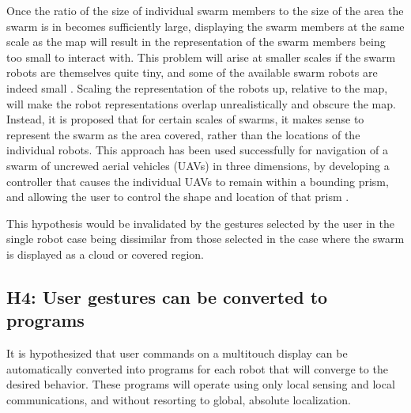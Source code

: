 Once the ratio of the size of individual swarm members to the size of the area the swarm is in becomes sufficiently large, displaying the swarm members at the same scale as the map will result in the representation of the swarm members being too small to interact with. 
This problem will arise at smaller scales if the swarm robots are themselves quite tiny, and some of the available swarm robots are indeed small \citep{pelrine2012diamagnetically}.
Scaling the representation of the robots up, relative to the map, will make the robot representations overlap unrealistically and obscure the map. 
Instead, it is proposed that for certain scales of swarms, it makes sense to represent the swarm as the area covered, rather than the locations of the individual robots.
This approach has been used successfully for navigation of a swarm of uncrewed aerial vehicles (UAVs) in three dimensions, by developing a controller that causes the individual UAVs to remain within a bounding prism, and allowing the user to control the shape and location of that prism \citep{ayanian2014controlling}.

This hypothesis would be invalidated by the gestures selected by the user in the single robot case being dissimilar from those selected in the case where the swarm is displayed as a cloud or covered region. 

\subsection{H4: User gestures can be converted to programs}

It is hypothesized that user commands on a multitouch display can be automatically converted into programs for each robot that will converge to the desired behavior. These programs will operate using only local sensing and local communications, and without resorting to global, absolute localization. 

